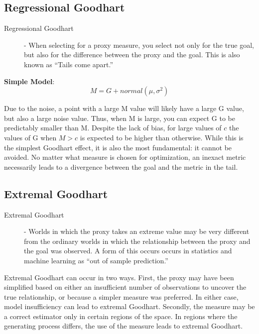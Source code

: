 \documentclass[10pt]{article}
\begin{document}
\subsection{Regressional Goodhart}

\begin{description}
\item[Regressional Goodhart] - When selecting for a proxy measure, you select not only for the true goal, but also for the difference between the proxy and the goal. This is also known as ``Tails come apart.'' \cite{tails}
\end{description} 
\textbf{Simple Model}:  \begin{equation}M = G + normal(\mu , \sigma ^2) \end{equation} 

\noindent Due to the noise, a point with a large M value will likely have a large G value, but also a large noise value. Thus, when M is large, you can expect G to be predictably smaller than M. Despite the lack of bias, for large values of $c$ the values of G when $M>c$ is expected to be higher than otherwise. While this is the simplest Goodhart effect, it is also the most fundamental: it cannot be avoided. No matter what measure is chosen for optimization, an inexact metric necessarily leads to a divergence between the goal and the metric in the tail. 

\subsection{Extremal Goodhart}

\begin{description}
\item[Extremal Goodhart] - Worlds in which the proxy takes an extreme value may be very different from the ordinary worlds in which the relationship between the proxy and the goal was observed. A form of this occurs occurs in statistics and machine learning as ``out of sample prediction.''
\end{description} 

\noindent Extremal Goodhart can occur in two ways. First, the proxy may have been simplified based on either an insufficient number of observations to uncover the true relationship, or because a simpler measure was preferred. In either case, model insufficiency can lead to extremal Goodhart. Secondly, the measure may be a correct estimator only in certain regions of the space. In regions where the generating process differs, the use of the measure leads to extremal Goodhart.
\end{document}
